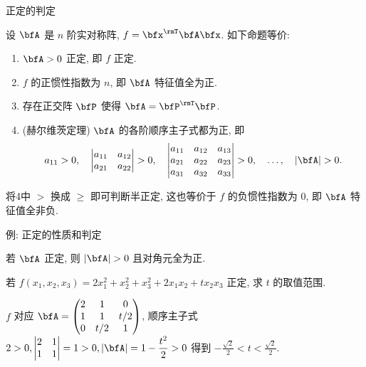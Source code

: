 \begin{frame}{正定的判定}
	\onslide<+->
	\begin{theorem}
		设 $\bfA$ 是 $n$ 阶实对称阵, $f=\bfx^\rmT\bfA\bfx$. 如下命题等价:
		\begin{enumerate}
			\item $\bfA>0$ 正定, 即 $f$ 正定.
			\item $f$ 的正惯性指数为 $n$, 即 $\bfA$ 特征值全为正.
			\item 存在正交阵 $\bfP$ 使得 $\bfA=\bfP^\rmT\bfP$.
			\item (赫尔维茨定理) $\bfA$ 的各阶顺序主子式都为正, 即
			\[a_{11}>0,\quad
			\begin{vmatrix}
				a_{11}&a_{12}\\
				a_{21}&a_{22}
			\end{vmatrix}>0,\quad
			\begin{vmatrix}
				a_{11}&a_{12}&a_{13}\\
				a_{21}&a_{22}&a_{23}\\
				a_{31}&a_{32}&a_{33}
			\end{vmatrix}>0,\quad
			\dots,\quad
			|\bfA|>0.\]
		\end{enumerate}
	\end{theorem}
	\onslide<+->
	将\enumnum4中 $>$ 换成 $\ge$ 即可判断半正定, 这也等价于 $f$ 的负惯性指数为 $0$, 即 $\bfA$ 特征值全非负.
\end{frame}


\begin{frame}{例: 正定的性质和判定}
	\onslide<+->
	\begin{corollary}
		若 $\bfA$ 正定, 则 $|\bfA|>0$ 且对角元全为正.
	\end{corollary}
	\onslide<+->
	\begin{example}
		若 $f(x_1,x_2,x_3)=2x_1^2+x_2^2+x_3^2+2x_1x_2+tx_2x_3$ 正定, 求 $t$ 的取值范围.
	\end{example}
	\onslide<+->
	\begin{solution}
		$f$ 对应 $\bfA=\begin{pmatrix}
			2&1&0\\
			1&1&t/2\\
			0&t/2&1
		\end{pmatrix}$, 顺序主子式 $2>0,\begin{vmatrix}
			2&1\\1&1
		\end{vmatrix}=1>0,|\bfA|=1-\dfrac{t^2}2>0$
		得到 $\displaystyle-\frac{\sqrt2}2<t<\frac{\sqrt2}2$.
	\end{solution}
\end{frame}


